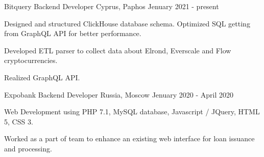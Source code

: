 

\begin{cventries}

  \cventry
    {Bitquery} %
    {Backend Developer} %
    {Cyprus, Paphos} %
    {Jenuary 2021 - present} %
    {
      \begin{cvitems} %
            \item {Designed and structured ClickHouse database schema. Optimized SQL getting from GraphQL API for better performance.}
          \item {Developed ETL parser to collect data about Elrond, Everscale and Flow cryptocurrencies.}
        \item {Realized GraphQL API.}
      \end{cvitems}
  }

  \cventry
    {Expobank} %
    {Backend Developer} %
    {Russia, Moscow} %
    {Jenuary 2020 - April 2020} %
    {
      \begin{cvitems} %
        \item {Web Development using PHP 7.1, MySQL database, Javascript / JQuery, HTML 5, CSS 3.}
        \item {Worked as a part of team to enhance an existing web interface for loan issuance and processing.}
      \end{cvitems}
  }

\end{cventries}
